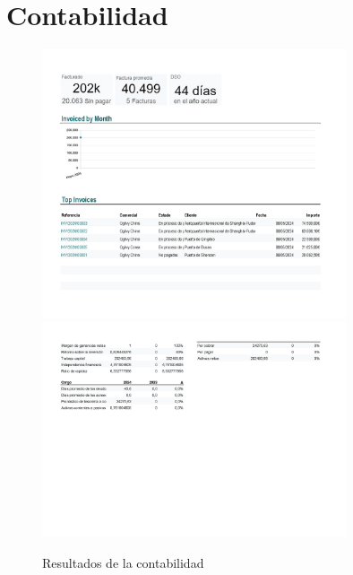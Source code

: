 \documentclass{report}
\begin{document}
        \section*{Contabilidad}
            \begin{figure}[H]
                \centering
                \includegraphics[width=0.8\textwidth]{./img/Contabilidad1.png}
                \includegraphics[width=0.8\textwidth]{./img/Contabilidad2.png}
                \caption{Resultados de la contabilidad}
            \end{figure}
\end{document}
